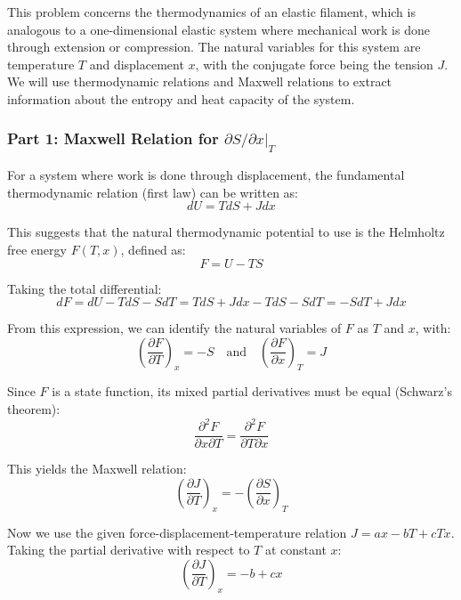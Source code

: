 \documentclass[10pt,twocoloumn]{article}
\begin{document}
This problem concerns the thermodynamics of an elastic filament, which is analogous to a one-dimensional elastic system where mechanical work is done through extension or compression. The natural variables for this system are temperature $T$ and displacement $x$, with the conjugate force being the tension $J$. We will use thermodynamic relations and Maxwell relations to extract information about the entropy and heat capacity of the system.

\subsubsection*{Part 1: Maxwell Relation for $\partial S / \partial x |_T$}

For a system where work is done through displacement, the fundamental thermodynamic relation (first law) can be written as:
\begin{equation}
    dU = TdS + Jdx
\end{equation}

This suggests that the natural thermodynamic potential to use is the Helmholtz free energy $F(T,x)$, defined as:
\begin{equation}
    F = U - TS
\end{equation}

Taking the total differential:
\begin{equation}dF = dU - TdS - SdT = TdS + Jdx - TdS - SdT = -SdT + Jdx\end{equation}

From this expression, we can identify the natural variables of $F$ as $T$ and $x$, with:
\begin{equation}
    \left(\frac{\partial F}{\partial T}\right)_x = -S \quad \text{and} \quad \left(\frac{\partial F}{\partial x}\right)_T = J
\end{equation}

Since $F$ is a state function, its mixed partial derivatives must be equal (Schwarz's theorem):
\begin{equation}
    \frac{\partial^2 F}{\partial x \partial T} = \frac{\partial^2 F}{\partial T \partial x}
\end{equation}

This yields the Maxwell relation:
\begin{equation}
    \left(\frac{\partial J}{\partial T}\right)_x = -\left(\frac{\partial S}{\partial x}\right)_T
\end{equation}

Now we use the given force-displacement-temperature relation $J = ax - bT + cTx$. Taking the partial derivative with respect to $T$ at constant $x$:
\begin{equation}
    \left(\frac{\partial J}{\partial T}\right)_x = -b + cx
\end{equation}
\end{document}

